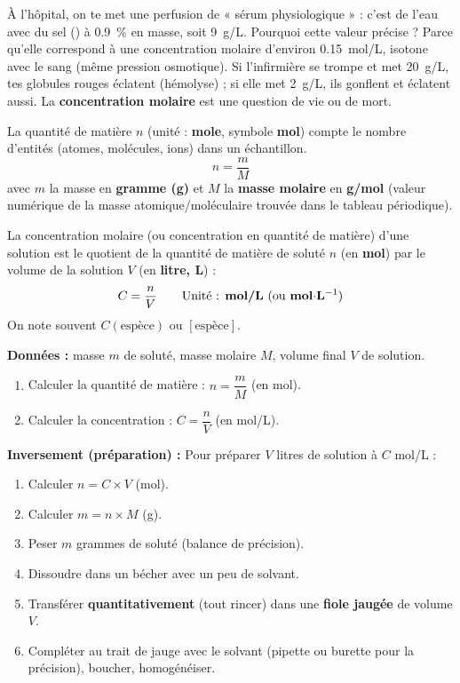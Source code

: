 \documentclass[11pt]{article}
\newcommand{\cle}[1]{{\popxbold\color{popdark}#1}}
\newcounter{popsec}
\newcounter{popsub}
\newcommand{\courssub}[1]{%
  \stepcounter{popsub}%
  \par\vspace{9pt}\noindent{\popxbold\fontsize{11.5}{13}\selectfont\color{popink}{\color{poporange}\thepopsec.\thepopsub}\hspace{6pt}#1}\par\nopagebreak\vspace{4pt}
}
\begin{document}
\courssub{Concentration molaire $C = n/V$}

\begin{exemplebox}
À l'hôpital, on te met une perfusion de « sérum physiologique » : c'est de l'eau avec du sel () à \SI{0,9}{\%} en masse, soit \SI{9}{g/L}. Pourquoi cette valeur précise ? Parce qu'elle correspond à une concentration molaire d'environ \SI{0,15}{mol/L}, isotone avec le sang (même pression osmotique). Si l'infirmière se trompe et met \SI{20}{g/L}, tes globules rouges éclatent (hémolyse) ; si elle met \SI{2}{g/L}, ils gonflent et éclatent aussi. La \textbf{concentration molaire} est une question de vie ou de mort.
\end{exemplebox}

\begin{definition}
La \cle{quantité de matière} $n$ (unité : \textbf{mole}, symbole \textbf{mol}) compte le nombre d'entités (atomes, molécules, ions) dans un échantillon.
\[ n = \frac{m}{M} \]
avec $m$ la masse en \textbf{gramme (g)} et $M$ la \textbf{masse molaire} en \textbf{g/mol} (valeur numérique de la masse atomique/moléculaire trouvée dans le tableau périodique).
\end{definition}

\begin{definition}
La \cle{concentration molaire} (ou concentration en quantité de matière) d'une solution est le quotient de la quantité de matière de soluté $n$ (en \textbf{mol}) par le volume de la solution $V$ (en \textbf{litre, L}) :
\[ C = \frac{n}{V} \qquad \text{Unité : \textbf{mol/L} (ou \textbf{mol$\cdot$L$^{-1}$})} \]
On note souvent $C(\text{espèce})$ ou $[\text{espèce}]$.
\end{definition}

\begin{methode}
\textbf{Données :} masse $m$ de soluté, masse molaire $M$, volume final $V$ de solution.
\begin{enumerate}
\item Calculer la quantité de matière : $n = \dfrac{m}{M}$ (en mol).
\item Calculer la concentration : $C = \dfrac{n}{V}$ (en mol/L).
\end{enumerate}
\textbf{Inversement (préparation) :} Pour préparer $V$ litres de solution à $C$ mol/L :
\begin{enumerate}
\item Calculer $n = C \times V$ (mol).
\item Calculer $m = n \times M$ (g).
\item Peser $m$ grammes de soluté (balance de précision).
\item Dissoudre dans un bécher avec un peu de solvant.
\item Transférer \textbf{quantitativement} (tout rincer) dans une \textbf{fiole jaugée} de volume $V$.
\item Compléter au trait de jauge avec le solvant (pipette ou burette pour la précision), boucher, homogénéiser.
\end{enumerate}
\end{methode}
\end{document}
